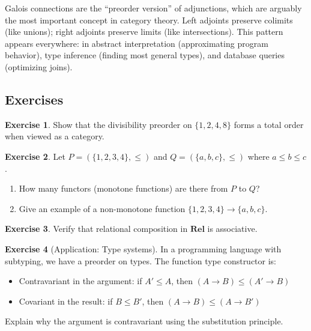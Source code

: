 \documentclass[11pt]{article}
\newcommand{\cat}[1]{\mathbf{#1}}
\newcommand{\Rel}{\cat{Rel}}
\theoremstyle{definition}
\newtheorem{exercise}{Exercise}[section]
\theoremstyle{plain}
\theoremstyle{remark}
\begin{document}
\begin{keyresult}
Galois connections are the ``preorder version'' of adjunctions, which are arguably the most important concept in category theory. Left adjoints preserve colimits (like unions); right adjoints preserve limits (like intersections). This pattern appears everywhere: in abstract interpretation (approximating program behavior), type inference (finding most general types), and database queries (optimizing joins).
\end{keyresult}

\subsection{Exercises}

\begin{exercise}
Show that the divisibility preorder on $\{1, 2, 4, 8\}$ forms a total order when viewed as a category.
\end{exercise}

\begin{exercise}
Let $P = (\{1, 2, 3, 4\}, \leq)$ and $Q = (\{a, b, c\}, \leq)$ where $a \leq b \leq c$.
\begin{enumerate}[label=(\alph*)]
  \item How many functors (monotone functions) are there from $P$ to $Q$?
  \item Give an example of a non-monotone function $\{1, 2, 3, 4\} \to \{a, b, c\}$.
\end{enumerate}
\end{exercise}

\begin{exercise}
Verify that relational composition in $\Rel$ is associative.
\end{exercise}

\begin{exercise}[Application: Type systems]
In a programming language with subtyping, we have a preorder on types. The function type constructor is:
\begin{itemize}
  \item Contravariant in the argument: if $A' \leq A$, then $(A \to B) \leq (A' \to B)$
  \item Covariant in the result: if $B \leq B'$, then $(A \to B) \leq (A \to B')$
\end{itemize}
Explain why the argument is contravariant using the substitution principle.
\end{exercise}

\end{document}
